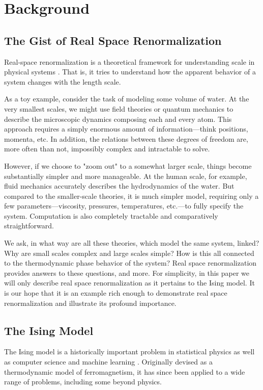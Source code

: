 \documentclass[%
    reprint,
    amsmath,amssymb,
    aps,
]{revtex4-2}
\begin{document}
\section{Background} \label{sec:background}

\subsection{The Gist of Real Space Renormalization}

Real-space renormalization is a theoretical framework for understanding scale in physical systems \cite{fisher-rg, wilson-rg}. That is, it tries to understand how the apparent behavior of a system changes with the length scale. 

As a toy example, consider the task of modeling some volume of water.
At the very smallest scales, we might use field theories or quantum mechanics to describe the microscopic dynamics composing each and every atom. 
This approach requires a simply enormous amount of information—think positions, momenta, etc. 
In addition, the relations between these degrees of freedom are, more often than not, impossibly complex and intractable to solve. 

However, if we choose to "zoom out" to a somewhat larger scale, things become substantially simpler and more manageable. 
At the human scale, for example, fluid mechanics accurately describes the hydrodynamics of the water. 
But compared to the smaller-scale theories, it is much simpler model, requiring only a few parameters—viscosity, pressures, temperatures, etc.—to fully specify the system. 
Computation is also completely tractable and comparatively straightforward. 

We ask, in what way are all these theories, which model the same system, linked? 
Why are small scales complex and large scales simple? 
How is this all connected to the thermodynamic phase behavior of the system? 
Real space renormalization provides answers to these questions, and more. 
For simplicity, in this paper we will only describe real space renormalization as it pertains to the Ising model. 
It is our hope that it is an example rich enough to demonstrate real space renormalization and illustrate its profound importance. 

\subsection{The Ising Model}

The Ising model is a historically important problem in statistical physics as well as computer science and machine learning \cite{brush-ising, ising}. 
Originally devised as a thermodynamic model of ferromagnetism, it has since been applied to a wide range of problems, including some beyond physics.
\end{document}
